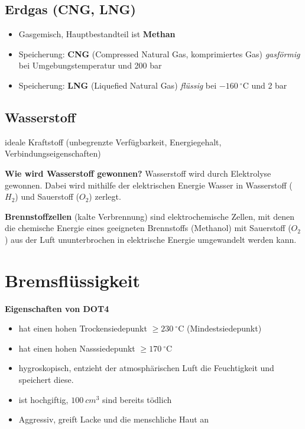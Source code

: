 \subsection{Erdgas (CNG, LNG)}\label{erdgas-cng-lng}

\begin{itemize}
\item
  Gasgemisch, Hauptbestandteil ist \textbf{Methan}
\item
  Speicherung: \textbf{CNG} (Compressed Natural Gas, komprimiertes Gas)
  \emph{gasförmig} bei Umgebungstemperatur und 200 bar
\item
  Speicherung: \textbf{LNG} (Liquefied Natural Gas) \emph{flüssig} bei
  $- 160~^\circ\text{C}$ und 2 bar
\end{itemize}

\subsection{Wasserstoff}\label{wasserstoff}

ideale Kraftstoff (unbegrenzte Verfügbarkeit, Energiegehalt,
Verbindungseigenschaften)

\textbf{Wie wird Wasserstoff gewonnen?} Wasserstoff wird durch
Elektrolyse gewonnen. Dabei wird mithilfe der elektrischen Energie
Wasser in Wasserstoff ($H_2$) und Sauerstoff ($O_2$) zerlegt.

\textbf{Brennstoffzellen} (kalte Verbrennung) sind elektrochemische
Zellen, mit denen die chemische Energie eines geeigneten Brennstoffs
(Methanol) mit Sauerstoff ($O_2$) aus der Luft ununterbrochen in
elektrische Energie umgewandelt werden kann.

\section{Bremsflüssigkeit}\label{bremsfluessigkeit}

\textbf{Eigenschaften von DOT4}

\begin{itemize}
\item
  hat einen hohen Trockensiedepunkt $\geq 230~^\circ\text{C}$
  (Mindestsiedepunkt)
\item
  hat einen hohen Nasssiedepunkt $\geq 170~^\circ\text{C}$
\item
  hygroskopisch, entzieht der atmosphärischen Luft die Feuchtigkeit und
  speichert diese.
\item
  ist hochgiftig, $100~cm^3$ sind bereits tödlich
\item
  Aggressiv, greift Lacke und die menschliche Haut an
\end{itemize}

